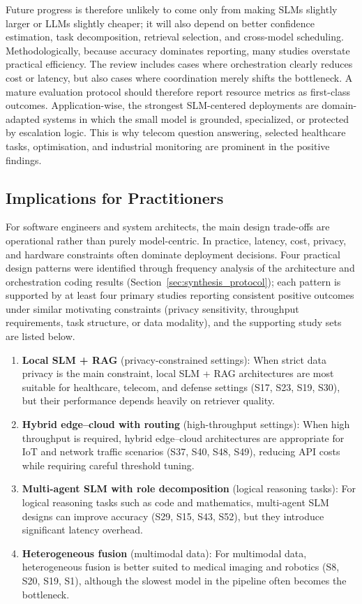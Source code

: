 Future progress is therefore unlikely to come only from making SLMs slightly larger or LLMs slightly cheaper; it will also depend on better confidence estimation, task decomposition, retrieval selection, and cross-model scheduling. Methodologically, because accuracy dominates reporting, many studies overstate practical efficiency. The review includes cases where orchestration clearly reduces cost or latency, but also cases where coordination merely shifts the bottleneck. A mature evaluation protocol should therefore report resource metrics as first-class outcomes. Application-wise, the strongest SLM-centered deployments are domain-adapted systems in which the small model is grounded, specialized, or protected by escalation logic. This is why telecom question answering, selected healthcare tasks, optimisation, and industrial monitoring are prominent in the positive findings.

\subsection{Implications for Practitioners}
\label{sec:implications}
For software engineers and system architects, the main design trade-offs are operational rather than purely model-centric. In practice, latency, cost, privacy, and hardware constraints often dominate deployment decisions. Four practical design patterns were identified through frequency analysis of the architecture and orchestration coding results (Section~\ref{sec:synthesis_protocol}); each pattern is supported by at least four primary studies reporting consistent positive outcomes under similar motivating constraints (privacy sensitivity, throughput requirements, task structure, or data modality), and the supporting study sets are listed below.

\begin{enumerate}
    \item \textbf{Local SLM + RAG} (privacy-constrained settings): When strict data privacy is the main constraint, local SLM + RAG architectures are most suitable for healthcare, telecom, and defense settings (S17, S23, S19, S30), but their performance depends heavily on retriever quality.
    \item \textbf{Hybrid edge--cloud with routing} (high-throughput settings): When high throughput is required, hybrid edge--cloud architectures are appropriate for IoT and network traffic scenarios (S37, S40, S48, S49), reducing API costs while requiring careful threshold tuning.
    \item \textbf{Multi-agent SLM with role decomposition} (logical reasoning tasks): For logical reasoning tasks such as code and mathematics, multi-agent SLM designs can improve accuracy (S29, S15, S43, S52), but they introduce significant latency overhead.
    \item \textbf{Heterogeneous fusion} (multimodal data): For multimodal data, heterogeneous fusion is better suited to medical imaging and robotics (S8, S20, S19, S1), although the slowest model in the pipeline often becomes the bottleneck.
\end{enumerate}

